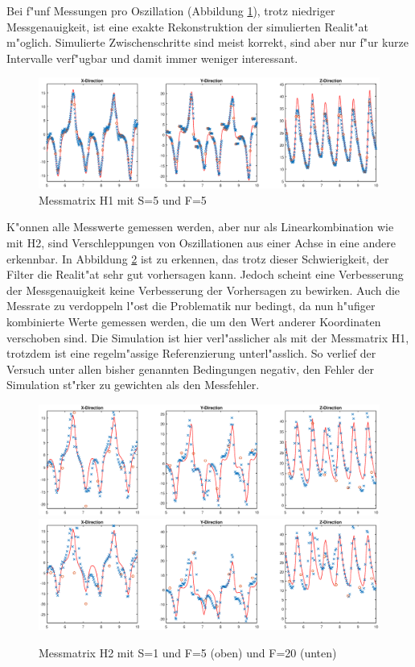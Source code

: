 \begin{refsection}
Bei f"unf Messungen pro Oszillation (Abbildung \ref{skript:H1S5}), trotz niedriger Messgenauigkeit, ist eine exakte Rekonstruktion der simulierten Realit"at m"oglich. Simulierte Zwischenschritte sind meist korrekt, sind aber nur f"ur kurze Intervalle verf"ugbar und damit immer weniger interessant.
\begin{figure}
\centering
\includegraphics[width=\hsize]{kalman/figures/H1R05S5.eps}
\caption{Messmatrix H1 mit S=5 und F=5}
\label{skript:H1S5}
\end{figure}

K"onnen alle Messwerte gemessen werden, aber nur als Linearkombination wie mit H2, sind Verschleppungen von Oszillationen aus einer Achse in eine andere erkennbar. In Abbildung \ref{skript:H2S1} ist zu erkennen, das trotz dieser Schwierigkeit, der Filter die Realit"at sehr gut vorhersagen kann. Jedoch scheint eine Verbesserung der Messgenauigkeit keine Verbesserung der Vorhersagen zu bewirken.
Auch die Messrate zu verdoppeln l"ost die Problematik nur bedingt, da nun h"ufiger kombinierte Werte gemessen werden, die um den Wert anderer Koordinaten verschoben sind. Die Simulation ist hier verl"asslicher als mit der Messmatrix H1, trotzdem ist eine regelm"assige Referenzierung unterl"asslich. So verlief der Versuch unter allen bisher genannten Bedingungen negativ, den Fehler der Simulation st"rker zu gewichten als den Messfehler.

\begin{figure}
\centering
\includegraphics[width=\hsize]{kalman/figures/H2R05S1.eps}
\includegraphics[width=\hsize]{kalman/figures/H2R20S1.eps}
\caption{Messmatrix H2 mit S=1 und F=5 (oben) und F=20 (unten)}
\label{skript:H2S1}
\end{figure}


\end{refsection}
